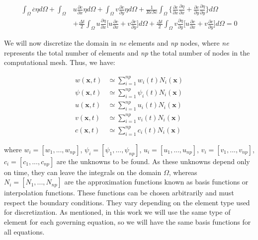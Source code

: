 \begin{equation} 
\begin{aligned} 
   \int_{\Omega} \overset{.}{c} \eta d\Omega 
 + \int_{\Omega} & u \frac{\partial c}{\partial x} \eta d\Omega 
 + \int_{\Omega} v \frac{\partial c}{\partial y} \eta d\Omega 
 + \frac{1}{\textit{ReSc}} \int_{\Omega} \Bigg\{ \frac{\partial c}{\partial x} \frac{\partial \eta}{\partial x} 
 + \frac{\partial c}{\partial y} \frac{\partial \eta}{\partial y} \Bigg\} d\Omega
 \\[5pt]
 & + \frac{\Delta t}{2} \int_{\Omega} u \frac{\partial \eta}{\partial x}
 \Bigg[
   u \frac{\partial c}{\partial x}
 + v \frac{\partial c}{\partial y}
 \Bigg] d\Omega
 + \frac{\Delta t}{2} \int_{\Omega} v \frac{\partial \eta}{\partial y}
 \Bigg[
   u \frac{\partial c}{\partial x}
 + v \frac{\partial c}{\partial y}
 \Bigg] d\Omega
 = 0
\end{aligned}
\end{equation}

\medskip
We will now discretize the domain in \textit{ne} elements and 
\textit{np} nodes, where \textit{ne} represents the total number 
of elements and \textit{np} the total number of nodes 
in the computational mesh. Thus, we have:

\begin{align}
 w(\textbf{x},t) & \simeq \sum\limits_{i=1}^{np} w_i(t) N_i(\textbf{x}) \\
 \psi(\textbf{x},t) & \simeq \sum\limits_{i=1}^{np} \psi_i(t) N_i(\textbf{x}) \\
 u(\textbf{x},t) & \simeq \sum\limits_{i=1}^{np} u_i(t) N_i(\textbf{x}) \\
 v(\textbf{x},t) & \simeq \sum\limits_{i=1}^{np} v_i(t) N_i(\textbf{x}) \\
 c(\textbf{x},t) & \simeq \sum\limits_{i=1}^{np} c_i(t) N_i(\textbf{x})
\end{align}

\noindent
where 
$w_i = [w_1,...,w_{np}]$,
$\psi_i = [\psi_1,...,\psi_{np}]$,
$u_i = [u_1,...,u_{np}]$,
$v_i = [v_1,...,v_{np}]$,
$c_i = [c_1,...,c_{np}]$ 
are the unknowns to be found. 
As these unknowns depend only on time, 
they can leave the integrals on the domain 
$\Omega$, whereas $N_i = [N_1, ..., N_{np}]$ 
are the approximation functions known 
as basis functions or interpolation functions. 
These functions can be chosen arbitrarily and 
must respect the boundary conditions. 
They vary depending on the element type used for discretization. 
As mentioned, in this work we will use the same type of element 
for each governing equation, 
so we will have the same basis functions for all equations.


